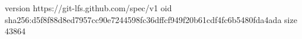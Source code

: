 version https://git-lfs.github.com/spec/v1
oid sha256:d5f8f88d8ed7957cc90e7244598fc36dffcf949f20b61cdf4fc6b5480fda4ada
size 43864
